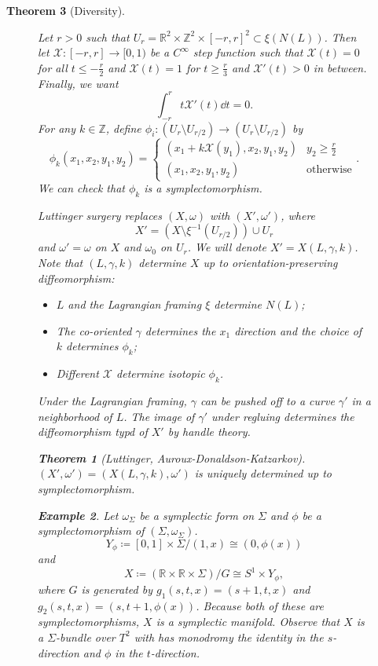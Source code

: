 \documentclass[leqno, openany]{memoir}
\newtheorem{thm}{Theorem}[chapter]
\theoremstyle{definition}
\newtheorem{exm}[thm]{Example}
\theoremstyle{remark}
\theoremstyle{plain}
\theoremstyle{definition}
\theoremstyle{remark}
\newcommand{\R}{\mathbb{R}}
\newcommand{\Z}{\mathbb{Z}}
\newcommand{\mc}[1]{\mathcal{#1}}
\begin{document}
\begin{thm}[Diversity]
\begin{figure}[H]
    Let $r > 0$ such that $U_r = \R^2 \times \Z^2 \times [-r,r]^2 \subset
    \xi(N(L))$. Then let $\mc{X}: [-r,r] \to [0,1)$ be a $C^{\infty}$ step
    function such that $\mc{X}(t) = 0$ for all $t \leq -\frac{r}{2}$ and
    $\mc{X}(t) = 1$ for $t \geq \frac{r}{3}$ and $\mc{X}'(t) > 0$ in between.
    Finally, we want \[ \int_{-r}^r t \mc{X}'(t) \dd{t} = 0. \] For any $k \in
    \Z$, define $\phi_i: (U_r \setminus U_{r/2}) \to (U_r \setminus U_{r/2})$
    by \[ \phi_k(x_1,x_2,y_1,y_2) = \begin{cases} (x_1 + k \mc{X}(y_1), x_2,
        y_1, y_2) & y_2 \geq \frac{r}{2} \\ (x_1,x_2,y_1,y_2) &
    \text{otherwise} \end{cases}. \] We can check that $\phi_k$ is a
    symplectomorphism.

    Luttinger surgery replaces $(X, \omega)$ with $(X',\omega')$, where \[ X' =
    (X \setminus \xi^{-1}(U_{r/2})) \cup U_r \] and $\omega' = \omega$ on $X$
    and $\omega_0$ on $U_r$. We will denote $X' = X(L, \gamma, k)$. Note that
    $(L, \gamma, k)$ determine $X$ up to orientation-preserving diffeomorphism:
    \begin{itemize} \item $L$ and the Lagrangian framing $\xi$ determine
        $N(L)$; \item The co-oriented $\gamma$ determines the $x_1$ direction
        and the choice of $k$ determines $\phi_k$; \item Different $\mc{X}$
determine isotopic $\phi_k$.  \end{itemize}

    Under the Lagrangian framing, $\gamma$ can be pushed off to a curve
    $\gamma'$ in a neighborhood of $L$. The image of $\gamma'$ under regluing
    determines the diffeomorphism typd of $X'$ by handle theory.

    \begin{thm}[Luttinger, Auroux-Donaldson-Katzarkov] $(X',\omega') = (X(L,
    \gamma, k), \omega')$ is uniquely determined up to symplectomorphism.
\end{thm}

    \begin{exm} Let $\omega_{\Sigma}$ be a symplectic form on $\Sigma$ and
        $\phi$ be a symplectomorphism of $(\Sigma, \omega_{\Sigma})$.  \[
            Y_{\phi} \coloneqq [0,1] \times \Sigma / (1,x) \cong (0,\phi(x)) \]
            and \[ X \coloneqq (\R \times \R \times \Sigma) / G \cong S^1
            \times Y_{\phi}, \] where $G$ is generated by $g_1(s,t,x) =
            (s+1,t,x)$ and $g_2(s,t,x) = (s,t+1,\phi(x))$. Because both of
            these are symplectomorphisms, $X$ is a symplectic manifold. Observe
            that $X$ is a $\Sigma$-bundle over $T^2$ with has monodromy the
            identity in the $s$-direction and $\phi$ in the $t$-direction. 


\end{exm}
\end{figure}
\end{thm}
\end{document}
